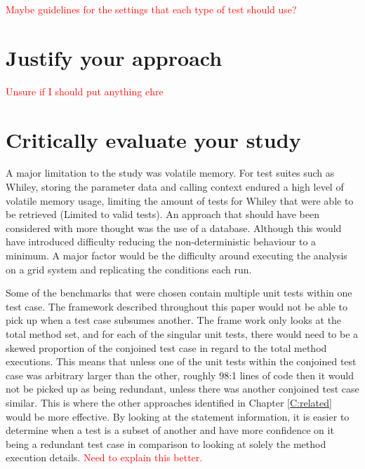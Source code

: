 \documentclass[11pt
              , a4paper
              , twoside
              , openright
              ]{report}
\newcommand\todo[1]{\textcolor{red}{#1}}
\begin{document}
\todo{Maybe guidelines for the settings that each type of test should use?}

\section{Justify your approach}

\todo{Unsure if I should put anything ehre}


\section{Critically evaluate your study}
\label{sec:crit}
A major limitation to the study was volatile memory. For test suites such as Whiley, storing the parameter data and calling context endured a high level of volatile memory usage, limiting the amount of tests for Whiley that were able to be retrieved (Limited to valid tests). An approach that should have been considered with more thought was the use of a database. Although this would have introduced difficulty reducing the non-deterministic behaviour to a minimum. A major factor would be the difficulty around executing the analysis on a grid system and replicating the conditions each run.

Some of the benchmarks that were chosen contain multiple unit tests within one test case. The framework described throughout this paper would not be able to pick up when a test case subsumes another. The frame work only looks at the total method set, and for each of the singular unit tests, there would need to be a skewed proportion of the conjoined test case in regard to the total method executions. This means that unless one of the unit tests within the conjoined test case was arbitrary larger than the other, roughly 98:1 lines of code then it would not be picked up as being redundant, unless there was another conjoined test case similar. This is where the other approaches identified in Chapter \ref{C:related} would be more effective. By looking at the statement information, it is easier to determine when a test is a subset of another and have more confidence on it being a redundant test case in comparison to looking at solely the method execution details. \todo{Need to explain this better.}
\end{document}
